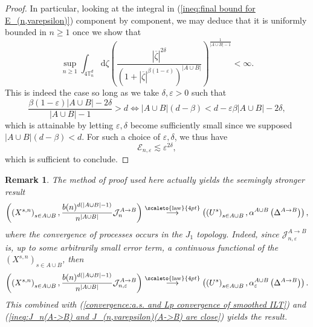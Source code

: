 \documentclass[12pt]{article}
\newcommand{\J}{\mathcal J}
\newcommand{\TT}{\mathbb T}
\newcommand{\1}{\mathds{1}}
\renewcommand{\d}{\mathrm d}
\newcommand{\distribution}{\stackrel{\scaleto{\mathrm{law}}{4pt}}{\longrightarrow}}
\newtheorem*{remark}{Remark}
\numberwithin{equation}{section}
\begin{document}
\begin{proof}
    In particular, looking at the integral in (\ref{ineq:final bound for E_(n,varepsilon)}) component by component, we may deduce that it is uniformly bounded in $n\ge1$ once we show that 
    \begin{equation}
        \label{ineq:uniform in n bound on E_(n,varepsilon)}
        \sup_{n\ge1}\int_{4\TT_n^{d}}\d\zeta\left(\frac{|\overline\zeta|^{2\delta}}{\left(1+|\overline\zeta|^{\beta(1-\varepsilon)}\right)^{|A\cup B|}}\right)^{\frac{1}{|A\cup B|-1}}<\infty.
    \end{equation}
    This is indeed the case so long as we take $\delta,\varepsilon>0$ such that 
    \begin{equation*}
        \frac{\beta(1-\varepsilon)|A\cup B|-2\delta}{|A\cup B|-1}>d\iff |A\cup B|(d-\beta)<d-\varepsilon\beta|A\cup B|-2\delta,
    \end{equation*}
    which is attainable by letting $\varepsilon,\delta$ become sufficiently small since we supposed $|A\cup B|(d-\beta)<d$. For such a choice of $\varepsilon,\delta$, we thus have
    \begin{equation*}
        \mathcal E_{n,\varepsilon}\lesssim\varepsilon^{2\delta},
    \end{equation*}
    which is sufficient to conclude.
\end{proof}
\begin{remark}
        The method of proof used here actually yields the seemingly stronger result
    \begin{equation*}
        \left(\left(X^{s,n}\right)_{s\in A\cup B},\frac{b(n)^{d(|A\cup B|-1)}}{n^{|A\cup B|}}\mathcal J_n^{A\rightarrow B}\right)\distribution\left(\left(U^s\right)_{s\in A\cup B},\alpha^{A\cup B}\left(\Delta^{A\rightarrow B}\right)\right),
    \end{equation*}
    where the convergence of processes occurs in the $J_1$ topology. Indeed, since $\J_{n,\varepsilon}^{A\rightarrow B}$ is, up to some arbitrarily small error term, a continuous functional of the $\left(X^{s,n}\right)_{s\in A\cup B}$, then 
    \begin{equation*}
        \left(\left(X^{s,n}\right)_{s\in A\cup B},\frac{b(n)^{d(|A\cup B|-1)}}{n^{|A\cup B|}}\mathcal J_{n,\varepsilon}^{A\rightarrow B}\right)\distribution\left(\left(U^s\right)_{s\in A\cup B},\alpha_\varepsilon^{A\cup B}\left(\Delta^{A\rightarrow B}\right)\right).
    \end{equation*}
    This combined with (\ref{convergence:a.s. and Lp convergence of smoothed ILT}) and (\ref{ineq:J_n(A->B) and J_(n,varepsilon)(A->B) are close}) yields the result.
    \end{remark}
\end{document}
